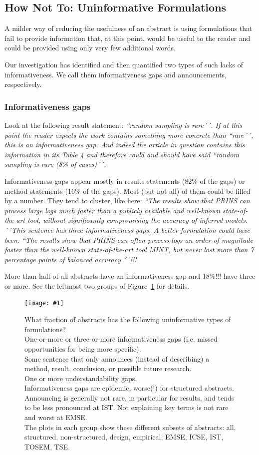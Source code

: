 \documentclass[10pt,journal,compsoc]{IEEEtran}
\newcommand{\Plotwide}[2]{%
	\begin{figure}[tbp]%
		\centering\texttt{[image: \#1]}%
		\vspace{-4mm}\caption{#2}\label{#1}%
    \end{figure}}
\newcommand{\Quote}[1]{\bgroup\itshape ``#1´´\egroup}
\newcommand{\Pseudoquote}[1]{\bgroup\itshape ``#1´´\egroup}
\newcommand{\Describegroups}{The plots in each group show these different subsets of abstracts:
	all, structured, non-structured, design, empirical, EMSE, ICSE, IST, TOSEM, TSE.}
\begin{document}
\subsection{How Not To: Uninformative Formulations}

A milder way of reducing the usefulness of an abstract is using formulations that
fail to provide information that, at this point, would be useful to the reader and 
could be provided using only very few additional words.

Our investigation has identified and then quantified two types
of such lacks of informativeness. 
We call them informativeness gaps and announcements, respectively.

\subsubsection{Informativeness gaps}

Look at the following result statement:
\Quote{random sampling is rare} [BalRal22]. %
If at this point the reader expects the work contains something more
concrete than \Quote{rare}, this is an informativeness gap.
And indeed the article in question contains this information in its
Table 4 and therefore could and should have said 
\Pseudoquote{random sampling is rare (8\% of cases)}.

Informativeness gaps appear mostly in results statements (82\% of the gaps)
or method statements (16\% of the gaps).
Most (but not all) of them could be filled by a number.
They tend to cluster,
like here:
\Quote{The results show that PRINS can process large logs much faster 
  than a publicly available and well-known state-of-the-art tool, 
  without significantly compromising the accuracy of inferred models.} [ShiBiaBri22] %
This sentence has three informativeness gaps. 
A better formulation could have been:
\Pseudoquote{The results show that PRINS can often process logs an order of magnitude faster 
  than the well-known state-of-the-art tool MINT, 
  but never lost more than 7 percentage points of balanced accuracy.}!!!

More than half of all abstracts have an informativeness gap
and 18\%!!! have three or more.
See the leftmost two groups of Figure~\ref{nonzerofractionbar_xletgroups_missinginfofractions} 
for details.

\Plotwide{nonzerofractionbar_xletgroups_missinginfofractions}{%
	What fraction of abstracts has the following uninformative types of formulations?\\
	One-or-more or three-or-more informativeness gaps (i.e. missed opportunities for being more specific).\\
	Some sentence that only announces (instead of describing) a method, result, conclusion, or 
	possible future research.\\
	One or more understandability gaps.\\
	Informativeness gaps are epidemic, worse(!) for structured abstracts.
	Announcing is generally not rare, in particular for results, and tends to be less pronounced
	at IST. 
	Not explaining key terms is not rare and worst at EMSE.\\
	\Describegroups}
\end{document}
